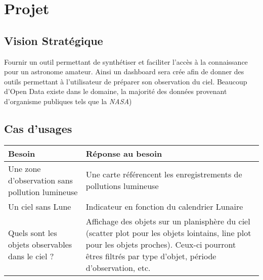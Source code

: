 \documentclass{article}
\begin{document}
\section{Projet}
\subsection{Vision Stratégique}
Fournir un outil permettant de synthétiser et faciliter l'accès à la connaissance pour un astronome amateur. Ainsi un dashboard sera crée afin de donner des outils permettant à l'utilisateur de préparer son observation du ciel. Beaucoup d'Open Data existe dans le domaine, la majorité des données provenant d'organisme publiques tels que la \textit{NASA}) 
\subsection{Cas d'usages}
\begin{tabular}{|S{L{5cm}}|S{L{5cm}}|}
\hline Besoin & Réponse au besoin  \\
\hline Une zone d'observation sans pollution lumineuse & Une carte référencent les enregistrements de pollutions lumineuse\\
\hline Un ciel sans Lune & Indicateur en fonction du calendrier Lunaire \\
\hline Quels sont les objets observables dans le ciel ? & Affichage des objets sur un planisphère du ciel (scatter plot pour les objets lointains, line plot pour les objets proches). Ceux-ci pourront êtres filtrés par type d'objet, période d'observation, etc. \\
\hline 
\end{tabular}

%
%
\end{document}
